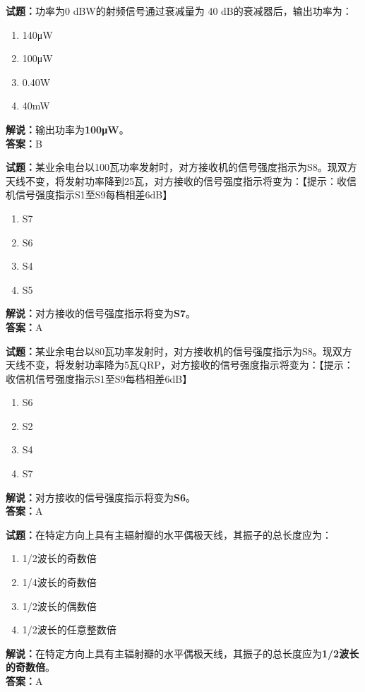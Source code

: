 \documentclass{ctexbook}
\begin{document}
\bigskip


\noindent\textbf{试题：}功率为0 dBW的射频信号通过衰减量为 40 dB的衰减器后，输出功率为：
\begin{enumerate}[leftmargin=3em]
\item 140μW
\item 100μW
\item 0.40W%
\item 40mW
\end{enumerate}
\noindent\textbf{解说：}输出功率为\textbf{100μW}。\\\noindent\textbf{答案：}B




\bigskip


\noindent\textbf{试题：}某业余电台以100瓦功率发射时，对方接收机的信号强度指示为S8。现双方天线不变，将发射功率降到25瓦，对方接收的信号强度指示将变为：【提示：收信机信号强度指示S1至S9每档相差6dB】
\begin{enumerate}[leftmargin=3em]
\item S7
\item S6
\item S4
\item S5
\end{enumerate}
\noindent\textbf{解说：}对方接收的信号强度指示将变为\textbf{S7}。\\\noindent\textbf{答案：}A



\bigskip


\noindent\textbf{试题：}某业余电台以80瓦功率发射时，对方接收机的信号强度指示为S8。现双方天线不变，将发射功率降为5瓦QRP，对方接收的信号强度指示将变为：【提示：收信机信号强度指示S1至S9每档相差6dB】
\begin{enumerate}[leftmargin=3em]
\item S6
\item S2
\item S4
\item S7
\end{enumerate}
\noindent\textbf{解说：}对方接收的信号强度指示将变为\textbf{S6}。\\\noindent\textbf{答案：}A



\bigskip


\noindent\textbf{试题：}在特定方向上具有主辐射瓣的水平偶极天线，其振子的总长度应为：
\begin{enumerate}[leftmargin=3em]
\item 1/2波长的奇数倍
\item 1/4波长的奇数倍
\item 1/2波长的偶数倍
\item 1/2波长的任意整数倍
\end{enumerate}
\noindent\textbf{解说：}在特定方向上具有主辐射瓣的水平偶极天线，其振子的总长度应为\textbf{1/2波长的奇数倍}。\\\noindent\textbf{答案：}A
\end{document}
